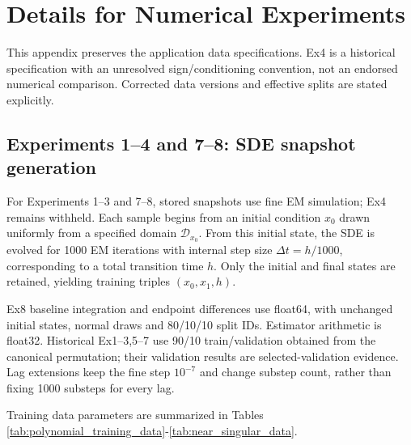 
\section{Details for Numerical Experiments}
\label{app:num_experiments}

This appendix preserves the application data specifications. Ex4 is a historical specification with an unresolved sign/conditioning convention, not an endorsed numerical comparison. Corrected data versions and effective splits are stated explicitly.

\subsection{Experiments 1--4 and 7--8: SDE snapshot generation}

For Experiments 1--3 and 7--8, stored snapshots use fine EM simulation; Ex4 remains withheld. Each sample begins from an initial condition $x_0$ drawn uniformly from a specified domain $\mathcal{D}_{x_0}$. From this initial state, the SDE is evolved for 1000 EM iterations with internal step size $\Delta t = h/1000$, corresponding to a total transition time $h$. Only the initial and final states are retained, yielding training triples $(x_0, x_1, h)$.

Ex8 baseline integration and endpoint differences use float64, with unchanged initial states, normal draws and 80/10/10 split IDs. Estimator arithmetic is float32. Historical Ex1--3,5--7 use 90/10 train/validation obtained from the canonical permutation; their validation results are selected-validation evidence. Lag extensions keep the fine step $10^{-7}$ and change substep count, rather than fixing 1000 substeps for every lag.

Training data parameters are summarized in Tables \ref{tab:polynomial_training_data}-\ref{tab:near_singular_data}.

